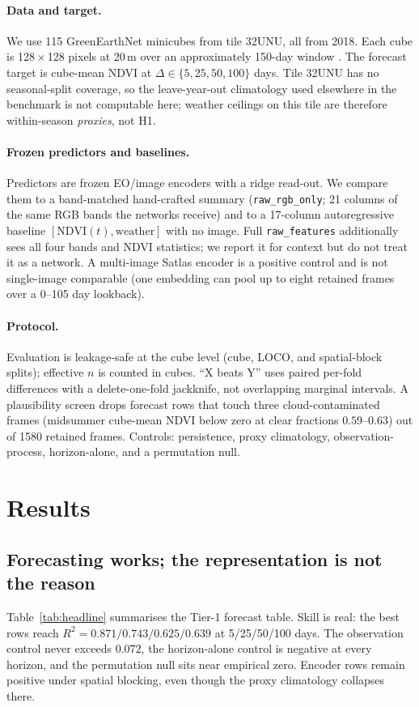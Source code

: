 \documentclass[10pt,twocolumn]{article}
\begin{document}
\paragraph{Data and target.}
We use 115 GreenEarthNet minicubes from tile 32UNU, all from 2018. Each cube is
128\,$\times$\,128 pixels at 20\,m over an approximately 150-day window
\citep{benson2024greenearthnet}. The forecast target is cube-mean NDVI at
$\Delta \in \{5,25,50,100\}$ days. Tile 32UNU has no seasonal-split coverage, so
the leave-year-out climatology used elsewhere in the benchmark is not
computable here; weather ceilings on this tile are therefore
within-season \emph{proxies}, not H1.

\paragraph{Frozen predictors and baselines.}
Predictors are frozen EO/image encoders with a ridge read-out. We compare them
to a band-matched hand-crafted summary (\texttt{raw\_rgb\_only}; 21 columns of
the same RGB bands the networks receive) and to a 17-column autoregressive
baseline $[\mathrm{NDVI}(t),\mathrm{weather}]$ with no image. Full
\texttt{raw\_features} additionally sees all four bands and NDVI statistics; we
report it for context but do not treat it as a network. A multi-image Satlas
encoder is a positive control and is not single-image comparable (one embedding
can pool up to eight retained frames over a 0--105 day lookback).

\paragraph{Protocol.}
Evaluation is leakage-safe at the cube level (cube, LOCO, and spatial-block
splits); effective $n$ is counted in cubes. ``X beats Y'' uses paired per-fold
differences with a delete-one-fold jackknife, not overlapping marginal
intervals. A plausibility screen drops forecast rows that touch three
cloud-contaminated frames (midsummer cube-mean NDVI below zero at clear
fractions $0.59$--$0.63$) out of 1580 retained frames. Controls: persistence,
proxy climatology, observation-process, horizon-alone, and a permutation null.

\section{Results}
\subsection{Forecasting works; the representation is not the reason}
Table~\ref{tab:headline} summarises the Tier-1 forecast table. Skill is real:
the best rows reach $R^2=0.871/0.743/0.625/0.639$ at 5/25/50/100 days. The
observation control never exceeds $0.072$, the horizon-alone control is negative
at every horizon, and the permutation null sits near empirical zero. Encoder
rows remain positive under spatial blocking, even though the proxy climatology
collapses there.
\end{document}
